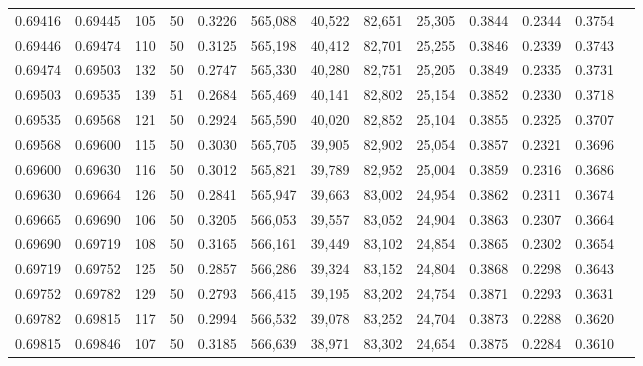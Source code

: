\begin{tabular}{rrrrrrrrrrrrr}
0.69416 & 0.69445 &   105 &  50 &                                     0.3226 & 565,088 &  40,522 &  82,651 &  25,305 & 0.3844 & 0.2344 & 0.3754 \\
0.69446 & 0.69474 &   110 &  50 &                                     0.3125 & 565,198 &  40,412 &  82,701 &  25,255 & 0.3846 & 0.2339 & 0.3743 \\
0.69474 & 0.69503 &   132 &  50 &                                     0.2747 & 565,330 &  40,280 &  82,751 &  25,205 & 0.3849 & 0.2335 & 0.3731 \\
0.69503 & 0.69535 &   139 &  51 &                                     0.2684 & 565,469 &  40,141 &  82,802 &  25,154 & 0.3852 & 0.2330 & 0.3718 \\
0.69535 & 0.69568 &   121 &  50 &                                     0.2924 & 565,590 &  40,020 &  82,852 &  25,104 & 0.3855 & 0.2325 & 0.3707 \\
0.69568 & 0.69600 &   115 &  50 &                                     0.3030 & 565,705 &  39,905 &  82,902 &  25,054 & 0.3857 & 0.2321 & 0.3696 \\
0.69600 & 0.69630 &   116 &  50 &                                     0.3012 & 565,821 &  39,789 &  82,952 &  25,004 & 0.3859 & 0.2316 & 0.3686 \\
0.69630 & 0.69664 &   126 &  50 &                                     0.2841 & 565,947 &  39,663 &  83,002 &  24,954 & 0.3862 & 0.2311 & 0.3674 \\
0.69665 & 0.69690 &   106 &  50 &                                     0.3205 & 566,053 &  39,557 &  83,052 &  24,904 & 0.3863 & 0.2307 & 0.3664 \\
0.69690 & 0.69719 &   108 &  50 &                                     0.3165 & 566,161 &  39,449 &  83,102 &  24,854 & 0.3865 & 0.2302 & 0.3654 \\
0.69719 & 0.69752 &   125 &  50 &                                     0.2857 & 566,286 &  39,324 &  83,152 &  24,804 & 0.3868 & 0.2298 & 0.3643 \\
0.69752 & 0.69782 &   129 &  50 &                                     0.2793 & 566,415 &  39,195 &  83,202 &  24,754 & 0.3871 & 0.2293 & 0.3631 \\
0.69782 & 0.69815 &   117 &  50 &                                     0.2994 & 566,532 &  39,078 &  83,252 &  24,704 & 0.3873 & 0.2288 & 0.3620 \\
0.69815 & 0.69846 &   107 &  50 &                                     0.3185 & 566,639 &  38,971 &  83,302 &  24,654 & 0.3875 & 0.2284 & 0.3610 \\

\end{tabular}
